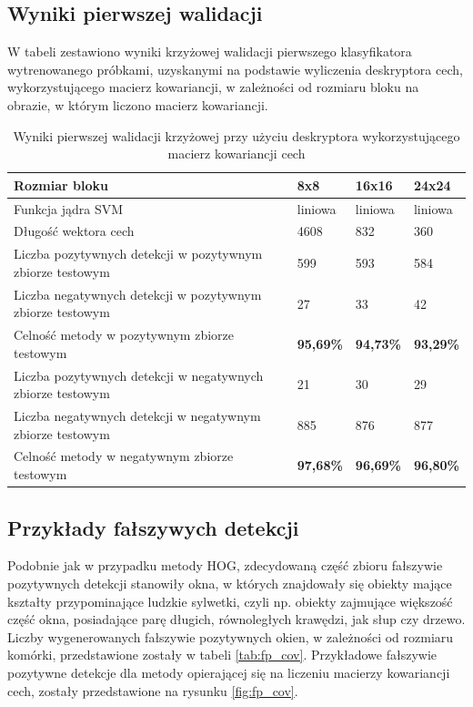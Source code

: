 \subsection{Wyniki pierwszej walidacji}

W tabeli zestawiono wyniki krzyżowej walidacji pierwszego klasyfikatora wytrenowanego 
próbkami, uzyskanymi na podstawie wyliczenia deskryptora cech, wykorzystującego macierz kowariancji, w zależności od rozmiaru bloku na obrazie, w którym liczono macierz kowariancji.

\begin{center}
    \begin{longtable}{ | p{5cm} | p{3cm} | p{3cm} | p{3cm} |}
    \caption{Wyniki pierwszej walidacji krzyżowej przy użyciu deskryptora wykorzystującego macierz kowariancji cech}
    \label{tab:cov_first}\\
    \hline
	Rozmiar bloku & 8x8 & 16x16 & 24x24 \\ \hline
	Funkcja jądra SVM & liniowa & liniowa & liniowa  \\ \hline
    Długość wektora cech & 4608 & 832 & 360 \\ \hline
    Liczba pozytywnych detekcji w pozytywnym zbiorze testowym & 599 & 593 & 584 \\ \hline
    Liczba negatywnych detekcji w pozytywnym zbiorze testowym & 27 & 33 & 42 \\ \hline
    Celność metody w pozytywnym zbiorze testowym & \textbf{95,69\%} & \textbf{94,73\%} & \textbf{93,29\%} \\ \hline
    Liczba pozytywnych detekcji w negatywnych zbiorze testowym & 21 & 30 & 29 \\ \hline
    Liczba negatywnych detekcji w negatywnym zbiorze testowym & 885 & 876 & 877 \\ \hline
    Celność metody w negatywnym zbiorze testowym & \textbf{97,68\%} & \textbf{96,69\%} & \textbf{96,80\%} \\ \hline
    \end{longtable}
\end{center}

\subsection{Przykłady fałszywych detekcji}

Podobnie jak w przypadku metody HOG, zdecydowaną część zbioru fałszywie pozytywnych detekcji stanowiły okna, w których znajdowały się obiekty mające kształty przypominające ludzkie sylwetki, czyli np. obiekty zajmujące większość część okna, posiadające parę długich, równoległych krawędzi, jak słup czy drzewo.
Liczby wygenerowanych fałszywie pozytywnych okien, w zależności od rozmiaru komórki, przedstawione zostały w tabeli \ref{tab:fp_cov}.
Przykładowe fałszywie pozytywne detekcje dla metody opierającej się na liczeniu macierzy kowariancji cech, zostały przedstawione na rysunku \ref{fig:fp_cov}.

